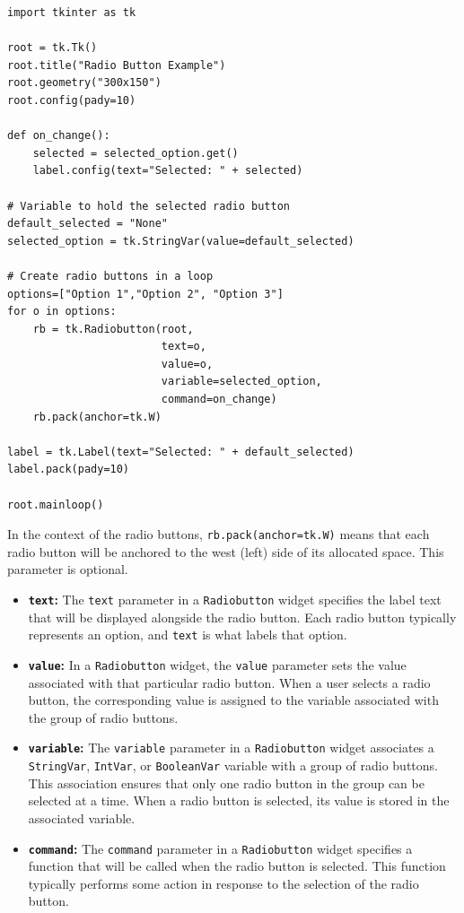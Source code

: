 \begin{codebox}
\begin{verbatim}
import tkinter as tk

root = tk.Tk()
root.title("Radio Button Example")
root.geometry("300x150")
root.config(pady=10)

def on_change():
    selected = selected_option.get()
    label.config(text="Selected: " + selected)

# Variable to hold the selected radio button
default_selected = "None"
selected_option = tk.StringVar(value=default_selected)

# Create radio buttons in a loop
options=["Option 1","Option 2", "Option 3"]
for o in options:
    rb = tk.Radiobutton(root, 
                        text=o, 
                        value=o, 
                        variable=selected_option,
                        command=on_change)
    rb.pack(anchor=tk.W)

label = tk.Label(text="Selected: " + default_selected)
label.pack(pady=10)

root.mainloop()
\end{verbatim}
\end{codebox}

In the context of the radio buttons, \texttt{rb.pack(anchor=tk.W)} means that each radio button will be anchored to the west (left) side of its allocated space. This parameter is optional.

\begin{itemize}
    \item \textbf{\texttt{text}:}
    The \texttt{text} parameter in a \texttt{Radiobutton} widget specifies the label text that will be displayed alongside the radio button. Each radio button typically represents an option, and \texttt{text} is what labels that option.
    
    \item \textbf{\texttt{value}:}
    In a \texttt{Radiobutton} widget, the \texttt{value} parameter sets the value associated with that particular radio button. When a user selects a radio button, the corresponding value is assigned to the variable associated with the group of radio buttons.
    
    \item \textbf{\texttt{variable}:}
    The \texttt{variable} parameter in a \texttt{Radiobutton} widget associates a \texttt{StringVar}, \texttt{IntVar}, or \texttt{BooleanVar} variable with a group of radio buttons. This association ensures that only one radio button in the group can be selected at a time. When a radio button is selected, its value is stored in the associated variable.
    
    \item \textbf{\texttt{command}:}
    The \texttt{command} parameter in a \texttt{Radiobutton} widget specifies a function that will be called when the radio button is selected. This function typically performs some action in response to the selection of the radio button.
\end{itemize}

